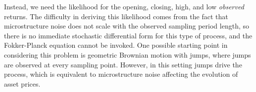 Instead, we need the likelihood for the opening, closing, high, and low \textit{observed} returns. The difficulty in deriving this likelihood comes from the fact that microstructure noise does not scale with the observed sampling period length, so there is no immediate stochastic differential form for this type of process, and the Fokker-Planck equation cannot be invoked. One possible starting point in considering this problem is geometric Brownian motion with jumps, where jumps are observed at every sampling point. However, in this setting jumps drive the process, which is equivalent to microstructure noise affecting the evolution of asset prices. 


%
%

